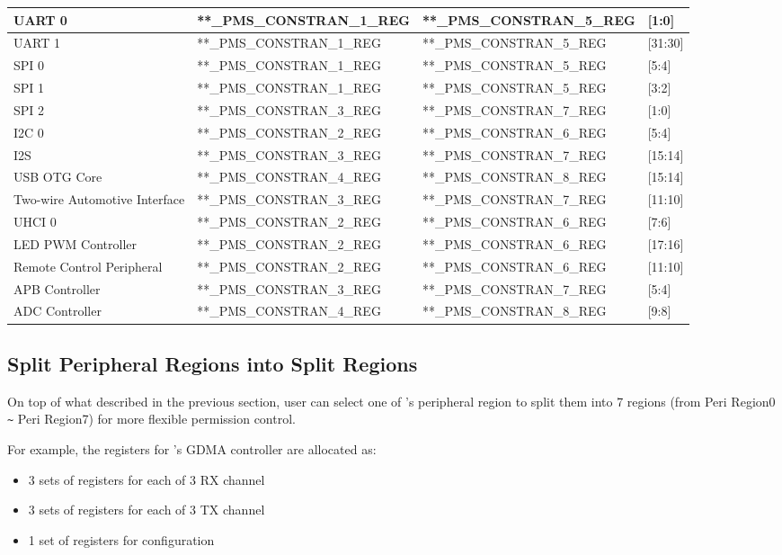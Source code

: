 \documentclass[main\_\_EN.tex]{subfiles}
\begin{document}
\begin{ThreePartTable}
\begin{longtable}[c]{ |l|l|l|l| }
    UART 0 & **\_PMS\_CONSTRAN\_1\_REG & **\_PMS\_CONSTRAN\_5\_REG & [1:0] \\\hline
    UART 1 & **\_PMS\_CONSTRAN\_1\_REG & **\_PMS\_CONSTRAN\_5\_REG & [31:30] \\\hline
    SPI 0 & **\_PMS\_CONSTRAN\_1\_REG & **\_PMS\_CONSTRAN\_5\_REG & [5:4] \\\hline
    SPI 1 & **\_PMS\_CONSTRAN\_1\_REG & **\_PMS\_CONSTRAN\_5\_REG & [3:2] \\\hline
    SPI 2 & **\_PMS\_CONSTRAN\_3\_REG & **\_PMS\_CONSTRAN\_7\_REG & [1:0] \\\hline
    I2C 0 & **\_PMS\_CONSTRAN\_2\_REG & **\_PMS\_CONSTRAN\_6\_REG & [5:4] \\\hline
    I2S & **\_PMS\_CONSTRAN\_3\_REG & **\_PMS\_CONSTRAN\_7\_REG & [15:14] \\\hline
    USB OTG Core & **\_PMS\_CONSTRAN\_4\_REG & **\_PMS\_CONSTRAN\_8\_REG & [15:14] \\\hline
    Two-wire Automotive Interface & **\_PMS\_CONSTRAN\_3\_REG & **\_PMS\_CONSTRAN\_7\_REG & [11:10] \\\hline
    UHCI 0  & **\_PMS\_CONSTRAN\_2\_REG & **\_PMS\_CONSTRAN\_6\_REG & [7:6] \\\hline
    LED PWM Controller  & **\_PMS\_CONSTRAN\_2\_REG & **\_PMS\_CONSTRAN\_6\_REG & [17:16] \\\hline
    Remote Control Peripheral  & **\_PMS\_CONSTRAN\_2\_REG & **\_PMS\_CONSTRAN\_6\_REG & [11:10] \\\hline
    APB Controller & **\_PMS\_CONSTRAN\_3\_REG & **\_PMS\_CONSTRAN\_7\_REG & [5:4] \\\hline
    ADC Controller & **\_PMS\_CONSTRAN\_4\_REG & **\_PMS\_CONSTRAN\_8\_REG & [9:8] \\\hline
\end{longtable}
\end{ThreePartTable}

\subsection{Split Peripheral Regions into Split Regions}

On top of what described in the previous section, user can select one of \chipname{}'s peripheral region to split them into 7 regions (from Peri Region0 \verb+~+ Peri Region7) for more flexible permission control.

For example, the registers for \chipname{}'s GDMA controller are allocated as:
\begin{itemize}
    \item 3 sets of registers for each of 3 RX channel
    \item 3 sets of registers for each of 3 TX channel
    \item 1 set of registers for configuration
\end{itemize}
\end{document}
